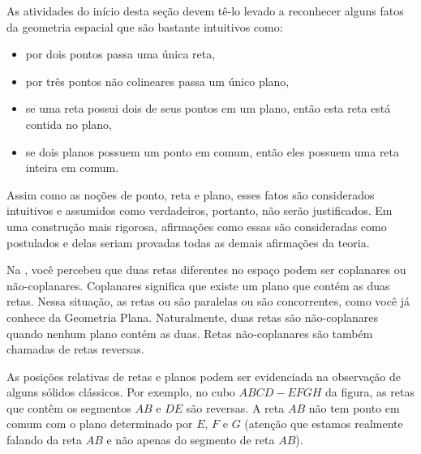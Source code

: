 \label{\detokenize{GE504-6:organizando-as-ideias-elementos-de-geometria-espacial-e-volumes}}\label{\detokenize{GE504-6::doc}}
As atividades do início desta seção devem tê-lo levado a reconhecer alguns fatos da geometria espacial que são bastante intuitivos como:
\begin{itemize}
\item {} 
por dois pontos passa uma única reta,

\item {} 
por três pontos não colineares passa um único plano,

\item {} 
se uma reta possui dois de seus pontos em um plano, então esta reta está contida no plano,

\item {} 
se dois planos possuem um ponto em comum, então eles possuem uma reta inteira em comum.

\end{itemize}

Assim como as noções de ponto, reta e plano, esses fatos são considerados intuitivos e assumidos como verdadeiros, portanto, não serão justificados. Em uma construção mais rigorosa, afirmações como essas são consideradas como postulados e delas seriam provadas todas as demais afirmações da teoria.

Na , você percebeu que duas retas diferentes no espaço podem ser coplanares ou não-coplanares. Coplanares significa que existe um plano que contém as duas retas. Nessa situação, as retas ou são paralelas ou são concorrentes, como você já conhece da Geometria Plana. Naturalmente, duas retas são não-coplanares quando nenhum plano contém as duas. Retas não-coplanares são também chamadas de retas reversas.

As posições relativas de retas e planos podem ser evidenciada na observação de alguns sólidos clássicos. Por exemplo, no cubo \(ABCD-EFGH\) da figura, as retas que contêm os segmentos \(AB\) e \(DE\) são reversas. A reta \(AB\) não tem ponto em comum com o plano determinado por \(E\), \(F\) e \(G\) (atenção que estamos realmente falando da reta \(AB\) e não apenas do segmento de reta \(AB\)).

